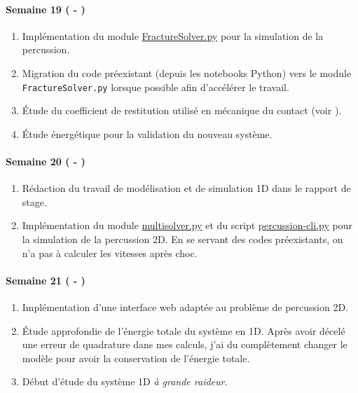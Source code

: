 \paragraph{Semaine 19 ( - )} 
\begin{enumerate}
    \item Implémentation du module \href{https://github.com/desmond-rn/ice-floes/blob/master/code/simu1D/FractureSolver.py}{FractureSolver.py} pour la simulation de la percussion.
    \item Migration du code préexistant (depuis les notebooks Python) vers le module \texttt{FractureSolver.py} lorsque possible afin d'accélérer le travail.
    \item Étude du coefficient de restitution utilisé en mécanique du contact (voir \parencite[p.21]{acary2004coefficients}).
    \item Étude énergétique pour la validation du nouveau système.
\end{enumerate}
  

\paragraph{Semaine 20 ( - )} 
\begin{enumerate}
    \item Rédaction du travail de modélisation et de simulation 1D dans le rapport de stage.
    \item Implémentation du module \href{https://framagit.org/RaK/SimuRessorts/-/blob/master/springslattice/multisolver.py}{multisolver.py} et du script \href{https://framagit.org/RaK/SimuRessorts/-/blob/master/percussion-cli.py}{percussion-cli.py} pour la simulation de la percussion 2D. En se servant des codes préexistants, on n'a pas à calculer les vitesses après choc. 
\end{enumerate}
  
\paragraph{Semaine 21 ( - )} 
\begin{enumerate}
    \item Implémentation d'une interface web adaptée au problème de percussion 2D. 
    \item Étude approfondie de l'énergie totale du système en 1D. Après avoir décelé une erreur de quadrature dans mes calculs, j'ai du complètement changer le modèle pour avoir la conservation de l'énergie totale.
    \item Début d'étude du système 1D \emph{à grande raideur}.
\end{enumerate}
  
